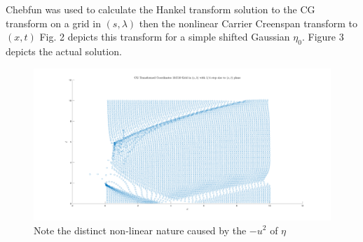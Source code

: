 \documentclass{article}
\begin{document}
Chebfun was used to calculate the Hankel transform solution to the CG transform on a grid in $(s,\lambda)$ then the nonlinear Carrier Creenspan transform to $(x,t)$ Fig. 2 depicts this transform for a simple shifted Gaussian $\eta_0$. Figure 3 depicts the actual solution.


\begin{figure}
   \includegraphics[scale=.13]{images/scatter.png} 
   \caption{Note the distinct non-linear nature caused by the $-u^2$ of $\eta$}
\end{figure}
\end{document}
